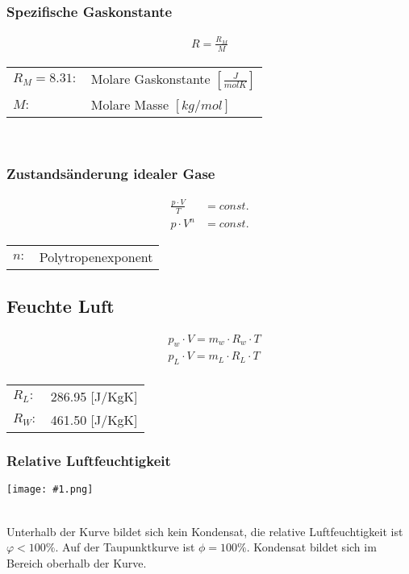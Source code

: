 \documentclass[landscape,a4paper,10pt]{article}
\newcommand{\graphiccol}[1]{
\noindent
\begin{minipage}{\columnwidth}
\centering
\texttt{[image: \#1.png]}
\end{minipage}
\medskip \\
}
\begin{document}
\begin{multicols*}{3}
\subsubsection{Spezifische Gaskonstante}
\begin{align*}
R = \frac{R_M}{M}
\end{align*}
\begin{tabular}{ll}
$R_M = 8.31:$ & Molare Gaskonstante $[\frac{J}{mol K}]$ \\
$M:$ & Molare Masse $[kg/mol]$
\end{tabular} \\


\subsubsection{Zustandsänderung idealer Gase}
\begin{align*}
\frac{p \cdot V}{T} &= const. \\
p \cdot V^n &= const.
\end{align*}
\begin{tabular}{ll}
$n:$ & Polytropenexponent
\end{tabular}


\subsection{Feuchte Luft}
\begin{align*}
&p_w \cdot V = m_w \cdot R_w \cdot T  \\
&p_L \cdot V = m_L \cdot R_L \cdot T  \\
\end{align*}

\begin{tabular}{ll}
$R_L:$ & 286.95 [J/KgK] \\
$R_W:$ & 461.50 [J/KgK] 
\end{tabular}


\subsubsection{Relative Luftfeuchtigkeit}
\graphiccol{taupunktkurve}
Unterhalb der Kurve bildet sich kein Kondensat, die relative Luftfeuchtigkeit ist $ \varphi < 100 \%$. 
Auf der Taupunktkurve ist  $\phi = 100 \%$. Kondensat bildet sich im Bereich oberhalb der Kurve. 


\end{multicols*}
\end{document}
